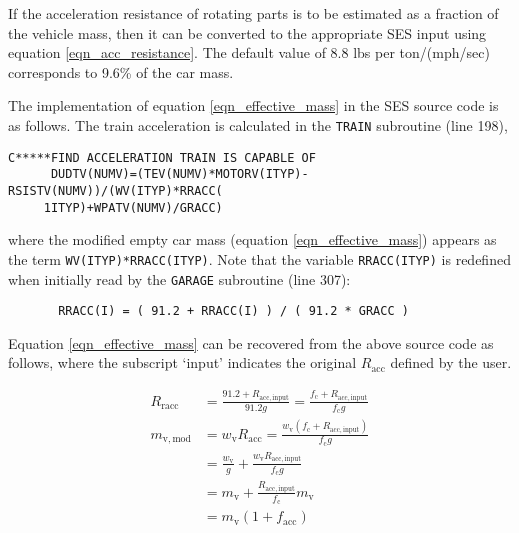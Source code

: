 \documentclass[11pt]{article} %
\begin{document}
If the acceleration resistance of rotating parts is to be estimated as a fraction of the vehicle mass, then it can be converted to the appropriate SES input using equation \ref{eqn_acc_resistance}.
The default value of 8.8 lbs per ton/(mph/sec) corresponds to 9.6\% of the car mass. 

The implementation of equation \ref{eqn_effective_mass} in the SES source code is as follows.
The train acceleration is calculated in the {\tt TRAIN} subroutine (line 198), 

\begin{lstlisting}
C*****FIND ACCELERATION TRAIN IS CAPABLE OF                             
      DUDTV(NUMV)=(TEV(NUMV)*MOTORV(ITYP)-RSISTV(NUMV))/(WV(ITYP)*RRACC(
     1ITYP)+WPATV(NUMV)/GRACC) 
\end{lstlisting}

where the modified empty car mass (equation \ref{eqn_effective_mass}) appears as the term {\tt WV(ITYP)*RRACC(ITYP)}.
Note that the variable {\tt RRACC(ITYP)} is redefined when initially read by the {\tt GARAGE} subroutine (line 307):

\begin{lstlisting}
       RRACC(I) = ( 91.2 + RRACC(I) ) / ( 91.2 * GRACC )               
\end{lstlisting}

Equation \ref{eqn_effective_mass} can be recovered from the above source code as follows, where the subscript `input' indicates the original $R_\mathrm{acc}$ defined by the user.

\begin{align*}
R_\mathrm{racc} &= \frac{91.2 + R_\mathrm{acc,input}}{91.2 g} = \frac{f_\mathrm{c} + R_\mathrm{acc,input}}{f_\mathrm{c} g} \\
m_{\mathrm{v,mod}} &= w_\mathrm{v} R_\mathrm{acc} = \frac{w_\mathrm{v} ( f_\mathrm{c} + R_\mathrm{acc,input} ) }{f_\mathrm{c} g} \\
 &= \frac{w_\mathrm{v}}{g} +  \frac{ w_\mathrm{v} R_\mathrm{acc,input}  }{f_\mathrm{c} g} \\
 &= m_\mathrm{v} +  \frac{ R_\mathrm{acc,input}  }{f_\mathrm{c}} m_\mathrm{v} \\
 &= m_\mathrm{v} \left(1 + f_\mathrm{acc}\right)
\end{align*}
\end{document}
